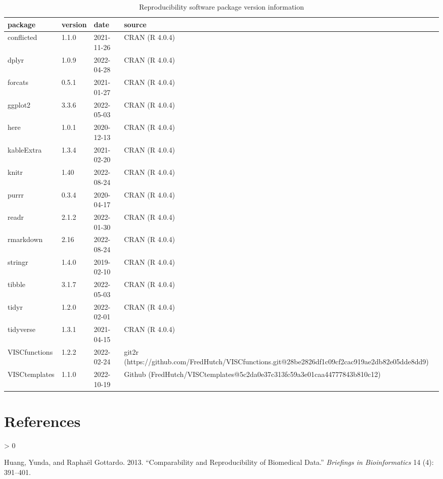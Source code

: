 \documentclass[11pt]{article}
\newlength{\cslhangindent}
\newenvironment{CSLReferences}[2] %
 {%
  \setlength{\parindent}{0pt}
  \ifodd #1 \everypar{\setlength{\hangindent}{\cslhangindent}}\ignorespaces\fi
  \ifnum #2 > 0
  \setlength{\parskip}{#2\baselineskip}
  \fi
 }%
 {}
\begin{document}
\begin{table}

\caption{\label{tab:Software-Package-Version-Information}Reproducibility software package version information}
\centering
\fontsize{10}{12}\selectfont
\begin{tabular}[t]{llll}
\toprule
package & version & date & source\\
\midrule
conflicted & 1.1.0 & 2021-11-26 & CRAN (R 4.0.4)\\
dplyr & 1.0.9 & 2022-04-28 & CRAN (R 4.0.4)\\
forcats & 0.5.1 & 2021-01-27 & CRAN (R 4.0.4)\\
ggplot2 & 3.3.6 & 2022-05-03 & CRAN (R 4.0.4)\\
here & 1.0.1 & 2020-12-13 & CRAN (R 4.0.4)\\
kableExtra & 1.3.4 & 2021-02-20 & CRAN (R 4.0.4)\\
knitr & 1.40 & 2022-08-24 & CRAN (R 4.0.4)\\
purrr & 0.3.4 & 2020-04-17 & CRAN (R 4.0.4)\\
readr & 2.1.2 & 2022-01-30 & CRAN (R 4.0.4)\\
rmarkdown & 2.16 & 2022-08-24 & CRAN (R 4.0.4)\\
stringr & 1.4.0 & 2019-02-10 & CRAN (R 4.0.4)\\
tibble & 3.1.7 & 2022-05-03 & CRAN (R 4.0.4)\\
tidyr & 1.2.0 & 2022-02-01 & CRAN (R 4.0.4)\\
tidyverse & 1.3.1 & 2021-04-15 & CRAN (R 4.0.4)\\
VISCfunctions & 1.2.2 & 2022-02-24 & git2r (https://github.com/FredHutch/VISCfunctions.git@28be2826df1c09cf2cac919ae2db82e05dde8dd9)\\
VISCtemplates & 1.1.0 & 2022-10-19 & Github (FredHutch/VISCtemplates@5c2da0e37c313fc59a3e01caa44777843b810c12)\\
\bottomrule
\end{tabular}
\end{table}

\clearpage

\hypertarget{references}{%
\section*{References}\label{references}}

\hypertarget{refs}{}
\begin{CSLReferences}{1}{0}
\leavevmode\hypertarget{ref-Huang:2013fl}{}%
Huang, Yunda, and Raphaël Gottardo. 2013. {``Comparability and Reproducibility of Biomedical Data.''} \emph{Briefings in Bioinformatics} 14 (4): 391--401.

\end{CSLReferences}
\label{LastPageOfBackMatter}~
\end{document}
